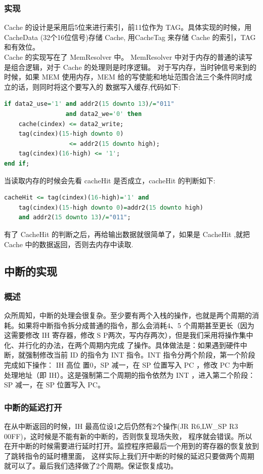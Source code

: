 \documentclass[10pt]{article}
\begin{document}
\begin{CJK}{UTF8}{gbsn}
\subsubsection{实现}
Cache 的设计是采用后5位来进行索引，前11位作为 TAG。具体实现的时候，用 CacheData (32个16位信号)存储 Cache, 用CacheTag 来存储
Cache 的索引，TAG和有效位。\\
Cache 的实现写在了 MemResolver 中。 MemResolver 中对于内存的普通的读写是组合逻辑，对于 Cache 的处理则是时序逻辑。
对于写内存，当时钟信号来到的时候，如果 MEM 使用内存，MEM 给的写使能和地址范围合法三个条件同时成立的话，则同时将这个要写入的
数据写入缓存,代码如下:\\
\begin{lstlisting}[language=vhdl]
if data2_use='1' and addr2(15 downto 13)/="011" 
                 and data2_we='0' then
	cache(cindex) <= data2_write;
	tag(cindex)(15-high downto 0) 
                  <= addr2(15 downto high);
	tag(cindex)(16-high) <= '1';		
end if;
\end{lstlisting}

当读取内存的时候会先看 cacheHit 是否成立，cacheHit 的判断如下:\\
\begin{lstlisting}[language=vhdl]
cacheHit <= tag(cindex)(16-high)='1' and 
    tag(cindex)(15-high downto 0)=addr2(15 downto high) 
    and addr2(15 downto 13)/="011";
\end{lstlisting}
有了 CacheHit 的判断之后，再给输出数据就很简单了，如果是 CacheHit ,就把 Cache 中的数据返回，否则去内存中读取.

\subsection{中断的实现}
\subsubsection{概述}
众所周知，中断的处理会很复杂。至少要有两个入栈的操作，也就是两个周期的消耗。如果将中断指令拆分成普通的指令，那么会消耗4、5
个周期甚至更长（因为这需要修改 IH 寄存器，修改 S P两次，写内存两次），但是我们采用将操作集中化、并行化的办法，在两个周期内完成
了操作。具体做法是：如果遇到硬件中断，就强制修改当前 ID 的指令为 INT 指令。INT 指令分两个阶段，第一个阶段完成如下操作： IH 高位
置0，SP 减一，在 SP 位置写入 PC ，修改 PC 为中断处理地址（即 IH）。这是强制第二个周期的指令依然为 INT ，进入第二个阶段：SP 减一，在 SP
位置写入  PC。

\subsubsection{中断的延迟打开}
在从中断返回的时候，IH 最高位设1之后仍然有2个操作(JR R6,LW\_SP R3 00FF)，这时候是不能有新的中断的，否则恢复现场失败，
程序就会错误。所以在开中断的时候需要进行延时打开。监控程序把最后一个用到的寄存器的恢复放到了跳转指令的延时槽里面，
这样实际上我们开中断的时候的延迟只要做两个周期就可以了。最后我们选择做了2个周期。保证恢复成功。


\end{CJK}
\end{document}
